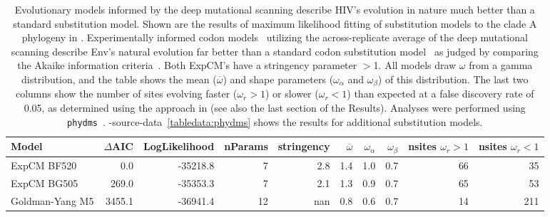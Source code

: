 \documentclass[9pt]{elife}
\begin{document}
\begin{table}
\begin{fullwidth}
{\centering 
\begin{tabular}{lrrrrrrrrr}
\toprule
           Model &  $\Delta$AIC &  LogLikelihood &  nParams &  stringency &  $\overline{\omega}$ &  $\omega_{\alpha}$ &  $\omega_{\beta}$ &  nsites $\omega_r > 1$ &  nsites $\omega_r < 1$ \\
\midrule
     ExpCM BF520 &          0.0 &       -35218.8 &        7 &         2.8 &                  1.4 &                1.0 &               0.7 &                     66 &                     35 \\
     ExpCM BG505 &        269.0 &       -35353.3 &        7 &         2.1 &                  1.3 &                0.9 &               0.7 &                     65 &                     53 \\
 Goldman-Yang M5 &       3455.1 &       -36941.4 &       12 &         nan &                  0.8 &                0.6 &               0.7 &                     14 &                    211 \\
\bottomrule
\end{tabular}
}
\caption{\label{tab:phydms}
Evolutionary models informed by the deep mutational scanning describe HIV's evolution in nature much better than a standard substitution model.
Shown are the results of maximum likelihood fitting of substitution models to the clade A phylogeny in .
Experimentally informed codon models~\citep[ExpCM,][]{hilton2017phydms} utilizing the across-replicate average of the deep mutational scanning describe Env's natural evolution far better than a standard codon substitution model~\citep[the M5 model of][]{yang2000codon} as judged by comparing the Akaike information criteria~\citep[$\Delta$AIC,][]{posada2004model}.
Both ExpCM's have a stringency parameter $>$1.
All models draw $\omega$ from a gamma distribution, and the table shows the mean ($\overline{\omega}$) and shape parameters ($\omega_{\alpha}$ and $\omega_{\beta}$) of this distribution.
The last two columns show the number of sites evolving faster ($\omega_r > 1$) or slower ($\omega_r < 1$) than expected at a false discovery rate of 0.05, as determined using the approach in \citet{bloom2017identification} (see also the last section of the Results).
Analyses were performed using \texttt{phydms}~\citep[][\url{http://jbloomlab.github.io/phydms/}]{hilton2017phydms}.
-source-data~\ref{tabledata:phydms} shows the results for additional substitution models.
}
\end{fullwidth}
\end{table}
\end{document}
